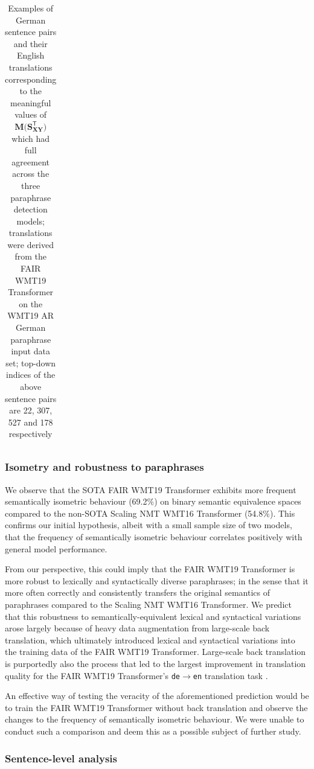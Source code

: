 \documentclass[11pt,a4paper]{article}
\begin{document}
\begin{table}[t!]
\begin{tabular*}{\textwidth}{ll p{5.9cm} p{5.9cm}}
    \hline
  \end{tabular*}
  \caption{Examples of German sentence pairs and their English translations corresponding to the meaningful values of $\mathbf{M(S_{XY}^{\mathsf{T}}})$ which had full agreement across the three paraphrase detection models; translations were derived from the FAIR WMT19 Transformer on the WMT19 AR German paraphrase input data set; top-down indices of the above sentence pairs are 22, 307, 527 and 178 respectively}
  \label{isometry_examples_sentences}
\end{table}

\subsubsection{Isometry and robustness to paraphrases}

We observe that the SOTA FAIR WMT19 Transformer exhibits more frequent semantically isometric behaviour (69.2$\%$) on binary semantic equivalence spaces compared to the non-SOTA Scaling NMT WMT16 Transformer (54.8$\%$). This confirms our initial hypothesis, albeit with a small sample size of two models, that the frequency of semantically isometric behaviour correlates positively with general model performance.

From our perspective, this could imply that the FAIR WMT19 Transformer is more robust to lexically and syntactically diverse paraphrases; in the sense that it more often correctly and consistently transfers the original semantics of paraphrases compared to the Scaling NMT WMT16 Transformer. We predict that this robustness to semantically-equivalent lexical and syntactical variations arose largely because of heavy data augmentation from large-scale back translation, which ultimately introduced lexical and syntactical variations into the training data of the FAIR WMT19 Transformer. Large-scale back translation is purportedly also the process that led to the largest improvement in translation quality for the FAIR WMT19 Transformer's \texttt{de$\rightarrow$en} translation task \cite{ng2019facebook}.

An effective way of testing the veracity of the aforementioned prediction would be to train the FAIR WMT19 Transformer without back translation and observe the changes to the frequency of semantically isometric behaviour. We were unable to conduct such a comparison and deem this as a possible subject of further study. 

\subsubsection{Sentence-level analysis}
\end{document}
